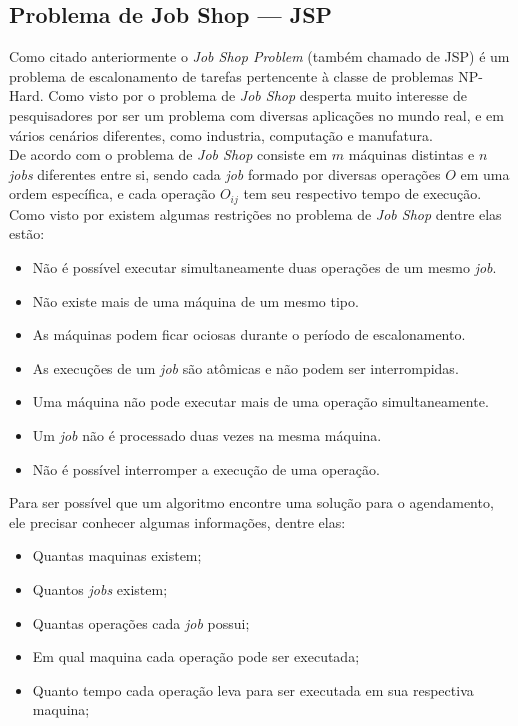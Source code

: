 \subsection{Problema de Job Shop — JSP}
    Como citado anteriormente o \textit{Job Shop Problem} (também chamado de JSP) é um problema de escalonamento de tarefas pertencente à classe de problemas NP-Hard. Como visto por \cite{Cheng1996} o problema de \textit{Job Shop} desperta muito interesse de pesquisadores por ser um problema com diversas aplicações no mundo real, e em vários cenários diferentes, como industria, computação e manufatura.\\
    \indent De acordo com \cite{Cheng1996} o problema de \textit{Job Shop} consiste em $m$ máquinas distintas e $n$ \textit{jobs} diferentes entre si, sendo cada \textit{job} formado por diversas operações $O$ em uma ordem específica, e cada operação $O_{ij}$ tem seu respectivo tempo de execução.\\
    \noindent Como visto por \cite{Bagchi1999} existem algumas restrições no problema de \textit{Job Shop} dentre elas estão:
    \begin{itemize}
        \item Não é possível executar simultaneamente duas operações de um mesmo \textit{job}.
        \item Não existe mais de uma máquina de um mesmo tipo.
        \item As máquinas podem ficar ociosas durante o período de escalonamento.
        \item As execuções de um \textit{job} são atômicas e não podem ser interrompidas.
        \item Uma máquina não pode executar mais de uma operação simultaneamente.
        \item Um \textit{job} não é processado duas vezes na mesma máquina.
        \item Não é possível interromper a execução de uma operação.
    \end{itemize}

    \noindent Para ser possível que um algoritmo encontre uma solução para o agendamento, ele precisar conhecer algumas informações, dentre elas: 
    \begin{itemize}
        \item Quantas maquinas existem;
        \item Quantos \textit{jobs} existem;
        \item Quantas operações cada \textit{job} possui;
        \item Em qual maquina cada operação pode ser executada;
        \item Quanto tempo cada operação leva para ser executada em sua respectiva maquina;
    \end{itemize}


